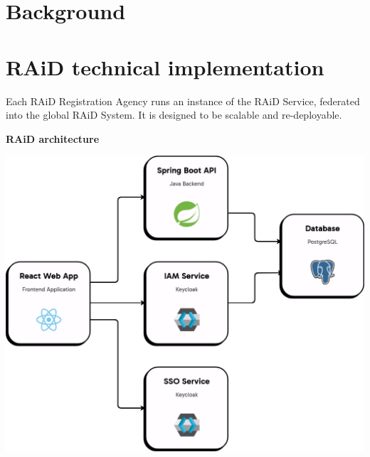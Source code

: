 \documentclass[a0,portrait]{a0poster}
\newenvironment{Figure}
  {\par\medskip\noindent\minipage{\linewidth}}
  {\endminipage\par\medskip}
\begin{document}
\begin{multicols}{3}

\color{ARDCPink}
\section*{\LARGE Background}
\color{DarkGrey}
\large{

}

\color{ARDCYellow}
\section*{\LARGE RAiD technical implementation}
\color{DarkGrey}
\large{
Each RAiD Registration Agency runs an instance of the RAiD Service, federated into the global RAiD System. It is designed to be scalable and re-deployable. 
}


\vspace{1cm}

\centerline{\textbf{RAiD architecture}}
\begin{Figure}
  \centering
  \includegraphics[width=0.75\linewidth]{figures/20241023-raid-architecture-appflow-basic.png}
  \label{basic-architecture}
\end{Figure}


\end{multicols}
\end{document}
